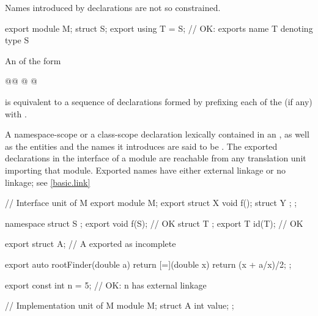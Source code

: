 \begin{std.txt}
  \enternote
  Names introduced by  declarations are not so constrained.
  \begin{example}
    \begin{codeblock}
      export module M;
      struct S;
      export using T = S;   // OK: exports name T denoting type S
    \end{codeblock}
  \end{example}
  \exitnote

  \alinea

  An  of the form
  \begin{grammar}
    @@ @\tcode{\{}  \tcode{\}}@ 
  \end{grammar}
  is equivalent to a sequence of declarations formed by prefixing each
   of the  (if any) with
  .

  \alinea
  A namespace-scope or a class-scope declaration lexically
  contained in an , as well as the
  entities and the names it introduces are said to be .
  The exported declarations in the interface of a module are reachable from
  any translation unit importing that module.  
  \enternote
  Exported names have either external linkage or no linkage; see \ref{basic.link}
  \exitnote
  \begin{example}
    \begin{codeblock}
      // Interface unit of M
      export module M;
      export struct X {
        void f();
        struct Y { };
      };

      namespace {
        struct S { };
      }
      export void f(S);    // OK
      struct T { };
      export T id(T);      // OK
  
      export struct A;     // A exported as incomplete

      export auto rootFinder(double a) {
        return [=](double x) { return (x + a/x)/2; };
      }

      export const int n = 5; // OK: n has external linkage
  
      // Implementation unit of M
      module M;
      struct A {
        int value;
      };
  

\end{codeblock}
\end{example}
\end{std.txt}
